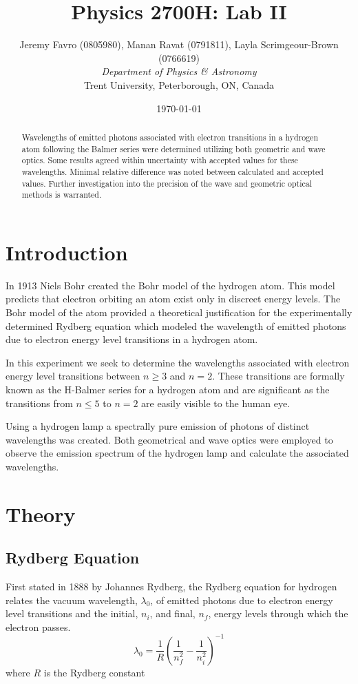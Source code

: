\documentclass[10pt, twocolumn]{article}
\title{Physics 2700H: Lab II}
\author{Jeremy Favro (0805980),
Manan Ravat (0791811),
Layla Scrimgeour-Brown (0766619)
 \\\emph{Department of Physics \& Astronomy}\\ Trent University, Peterborough, ON, Canada}
\date{\today}
\theoremstyle{definition}
\begin{document}
\maketitle
\begin{abstract}
  Wavelengths of emitted photons associated with electron transitions in a hydrogen atom following the Balmer series were determined utilizing both geometric and wave optics.
  Some results agreed within uncertainty with accepted values for these wavelengths. Minimal relative difference was noted between calculated and accepted values. Further
  investigation into the precision of the wave and geometric optical methods is warranted.
\end{abstract}
\section{Introduction}
In 1913 Niels Bohr created the Bohr model of the hydrogen atom. This model predicts that electron orbiting an atom exist only in discreet
energy levels. The Bohr model of the atom provided a theoretical justification for the experimentally determined Rydberg equation
which modeled the wavelength of emitted photons due to electron energy level transitions in a hydrogen atom.

In this experiment we seek to determine the wavelengths associated with electron energy level transitions between $n\geq 3$ and $n=2$.
These transitions are formally known as the H-Balmer series for a hydrogen atom and are significant as the transitions from $n\leq 5$ to $n=2$ are
easily visible to the human eye\cite{lab-manual}.

Using a hydrogen lamp a spectrally pure emission of photons of distinct wavelengths was created. Both
geometrical and wave optics were employed to observe the emission spectrum of the hydrogen lamp and calculate the associated wavelengths.
\section{Theory}
\subsection{Rydberg Equation}
First stated in 1888 by Johannes Rydberg, the Rydberg equation for hydrogen relates the vacuum wavelength, $\lambda_0$, of emitted photons due to electron energy level transitions
and the initial, $n_i$, and final, $n_f$, energy levels through which the electron passes.
\begin{equation}
  \lambda_{0}=\frac{1}{R}\left(\frac{1}{n_f^2}-\frac{1}{n_i^2}\right)^{-1}
\end{equation}
where $R$ is the Rydberg constant \cite{codata}
\end{document}

